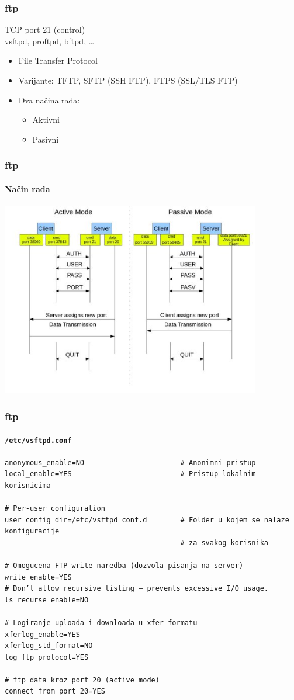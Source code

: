 \documentclass[t,table,usenames,dvipsnames]{beamer}
\begin{document}
\begin{frame}
	\frametitle{ftp}
	
	TCP port 21 (control)\\
	vsftpd, proftpd, bftpd, \ldots

	\begin{itemize}	
		\item File Transfer Protocol
		\item Varijante: TFTP, SFTP (SSH FTP), FTPS (SSL/TLS FTP)
		
		\item Dva načina rada:
		\begin{itemize}
			\item Aktivni
			\item Pasivni
		\end{itemize}
	\end{itemize}
\end{frame}

\begin{frame}
	\frametitle{ftp}
	\framesubtitle{Način rada}
	\centering
	\includegraphics[width=0.85\textwidth]{ftp.jpg}
\end{frame}


\begin{frame}[fragile]
	\frametitle{ftp}
	\framesubtitle{\texttt{/etc/vsftpd.conf}}
	\scriptsize
	\begin{verbatim}
anonymous_enable=NO                       # Anonimni pristup
local_enable=YES                          # Pristup lokalnim korisnicima

# Per-user configuration
user_config_dir=/etc/vsftpd_conf.d        # Folder u kojem se nalaze konfiguracije
                                          # za svakog korisnika

# Omogucena FTP write naredba (dozvola pisanja na server)
write_enable=YES
# Don’t allow recursive listing – prevents excessive I/O usage.
ls_recurse_enable=NO

# Logiranje uploada i downloada u xfer formatu
xferlog_enable=YES
xferlog_std_format=NO
log_ftp_protocol=YES

# ftp data kroz port 20 (active mode)
connect_from_port_20=YES
	\end{verbatim}

\end{frame}
\end{document}
